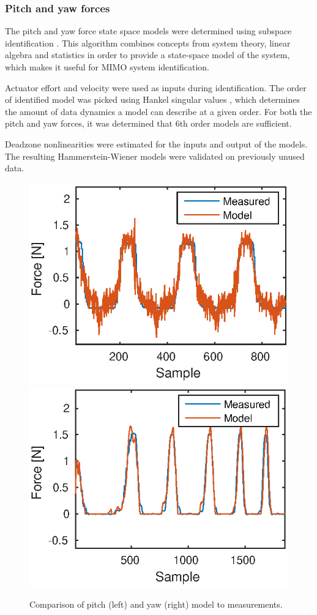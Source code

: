\subsubsection{Pitch and yaw forces}
The pitch and yaw force state space models were determined using subspace identification  \cite{van2012subspace}. This algorithm combines concepts from system theory, linear algebra and statistics in order to provide a state-space model of the system, which makes it useful for MIMO system identification. 

Actuator effort and velocity were used as inputs during identification.
The order of identified model was picked using Hankel singular values \cite{gawronski1990model}, which determines the amount of data dynamics a model can describe at a given order. For both the pitch and yaw forces, it was determined that 6th order models are sufficient. 

Deadzone nonlinearities were estimated for the inputs and output of the models. 
The resulting Hammerstein-Wiener models were validated on previously unused data.

 \begin{figure}[h]
 \centering
 \includegraphics[width=0.49\linewidth]{modelpitch2_a}
 \includegraphics[width=0.49\linewidth]{modelyaw_a}
 \caption{Comparison of pitch (left) and yaw (right) model to measurements.}
 \label{fig:final_res_yaw}
 \end{figure}



